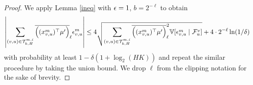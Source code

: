 \begin{proof}
We apply Lemma \ref{ineq} with $\epsilon=1$, $b=2^{-\ell}$ to obtain 
\begin{equation*}
    \lt|\sum_{(v,u)\in \mathcal{T}_{k,H}^{m,i}} \clip{(x_{v,u}^m)^\T \mu' }_\ell \eps_{v,u}^{m}\rt| \leq 4\sqrt{\sum_{(v,u)\in \mathcal{T}_{k,H}^{m,i}} \clip{(x_{v,u}^m)^\T\mu' }_\ell^2 \VV[\eps^m_{v,u} \mid \cF_{u}^v] } +  4 \cdot 2^{-\ell} \ln(1/\dt)
\end{equation*}
with probability at least $1-\delta(1+\log_2 (HK))$ and repeat the similar procedure by taking the union bound. 
We drop $\ell$ from the clipping notation for the sake of brevity. 


\end{proof}
